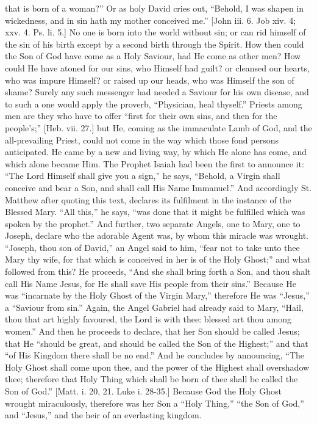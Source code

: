 that is born of a woman?'' Or as holy David cries out,
``Behold, I was shapen in wickedness, and in sin hath my mother
conceived me.'' [John iii. 6. Job xiv. 4; xxv. 4. Ps. li. 5.] No
one is born into the world without sin; or can rid himself of the sin
of his birth except by a second birth through the Spirit. How then
could the Son of God have come as a Holy Saviour, had He come as other
men? How could He have atoned for our sins, who Himself had guilt? or
cleansed our hearts, who was impure Himself? or raised up our heads,
who was Himself the son of shame? Surely any such messenger had needed
a Saviour for his own disease, and to such a one would apply the
proverb, ``Physician, heal thyself.'' Priests among men are they who
have to offer ``first for their own sins, and then for the
people's;'' [Heb. vii. 27.] but He, coming as the immaculate Lamb
of God, and the all-prevailing Priest, could not come in the way which
those fond persons anticipated. He came by a new and living way, by
which He alone has come, and which alone became Him. The Prophet
Isaiah had been the first to announce it: ``The Lord Himself shall
give you a sign,'' he says, ``Behold, a Virgin shall conceive
and bear a Son, and shall call His Name Immanuel.'' And
accordingly St. Matthew after quoting this text, declares its
fulfilment in the instance of the Blessed Mary. ``All this,''
he says, ``was done that it might be fulfilled which was spoken by
the prophet.'' And further, two separate Angels, one to Mary, one
to Joseph, declare who the adorable Agent was, by whom this miracle
was wrought. ``Joseph, thou son of David,'' an Angel said to
him, ``fear not to take unto thee Mary thy wife, for that which is
conceived in her is of the Holy Ghost;'' and what followed from
this? He proceeds, ``And she shall bring forth a Son, and thou
shalt call His Name Jesus, for He shall save His people from their
sins.'' Because He was ``incarnate by the Holy Ghost of the
Virgin Mary,'' therefore He was ``Jesus,'' a ``Saviour
from sin.'' Again, the Angel Gabriel had already said to Mary,
``Hail, thou that art highly favoured, the Lord is with thee:
blessed art thou among women.'' And then he proceeds to declare,
that her Son should be called Jesus; that He ``should be great,
and should be called the Son of the Highest;'' and that ``of
His Kingdom there shall be no end.'' And he concludes by
announcing, ``The Holy Ghost shall come upon thee, and the power
of the Highest shall overshadow thee; therefore that Holy Thing which
shall be born of thee shall be called the Son of God.'' [Matt. i.
20, 21. Luke i. 28-35.] Because God the Holy Ghost wrought
miraculously, therefore was her Son a ``Holy Thing,''
``the Son of God,'' and ``Jesus,'' and the heir of an
everlasting kingdom.

